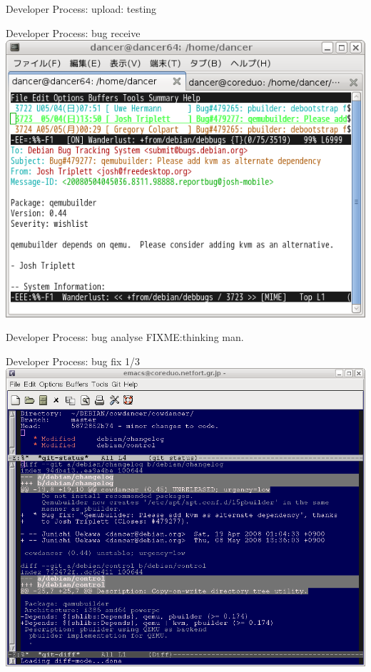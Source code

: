 \documentclass[cjk,dvipdfm,12pt]{beamer}
\begin{document}
\begin{frame}{Developer Process: upload: testing}
\begin{minipage}{0.4\hsize}
\end{minipage}
\end{frame}

\begin{frame}{Developer Process: bug receive}
 \includegraphics[width=1\hsize]{image200805/bug1.png}
\end{frame}

\begin{frame}{Developer Process: bug analyse}
FIXME:thinking man.
\end{frame}

\begin{frame}{Developer Process: bug fix 1/3}
 \includegraphics[width=1\hsize]{image200805/bug2.png}
\end{frame}
\end{document}
